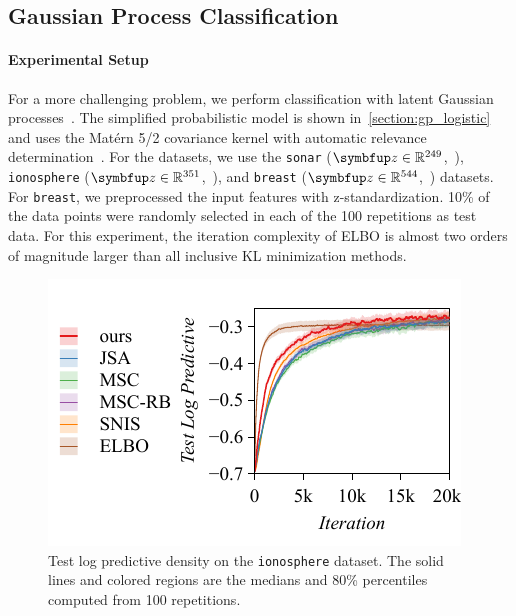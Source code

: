   \vspace{-0.05in}
\subsection{Gaussian Process Classification}\label{section:bgp}
  \vspace{-0.05in}
\paragraph{Experimental Setup}
For a more challenging problem, we perform classification with latent Gaussian processes~\citep{NIPS2014_8c6744c9}.
The simplified probabilistic model is shown in~\cref{section:gp_logistic} and uses the Mat\'ern 5/2 covariance kernel with automatic relevance determination~\citep{neal_bayesian_1996}.
For the datasets, we use the \texttt{sonar} (\(\vz \in \mathbb{R}^{249}\),~\citealt{gorman_analysis_1988}), \texttt{ionosphere} (\(\vz \in \mathbb{R}^{351}\),~\citealt{Sigillito1989ClassificationOR}), and \texttt{breast} (\(\vz \in \mathbb{R}^{544}\),~\citealt{wolberg_multisurface_1990}) datasets.
For \texttt{breast}, we preprocessed the input features with z-standardization.
10\% of the data points were randomly selected in each of the 100 repetitions as test data.
For this experiment, the iteration complexity of ELBO is almost two orders of magnitude larger than all inclusive KL minimization methods.

%
\begin{figure}
  \vspace{-0.4in}
  \centering
     \includegraphics[scale=0.9]{figures/ionosphere_01.pdf}
     \vspace{-0.1in}
  \caption{Test log predictive density on the \texttt{ionosphere} dataset.
    The solid lines and colored regions are the medians and 80\% percentiles computed from 100 repetitions.
  }\label{fig:gp}
  \vspace{-0.2in}
\end{figure}
%
\vspace{-0.05in}
